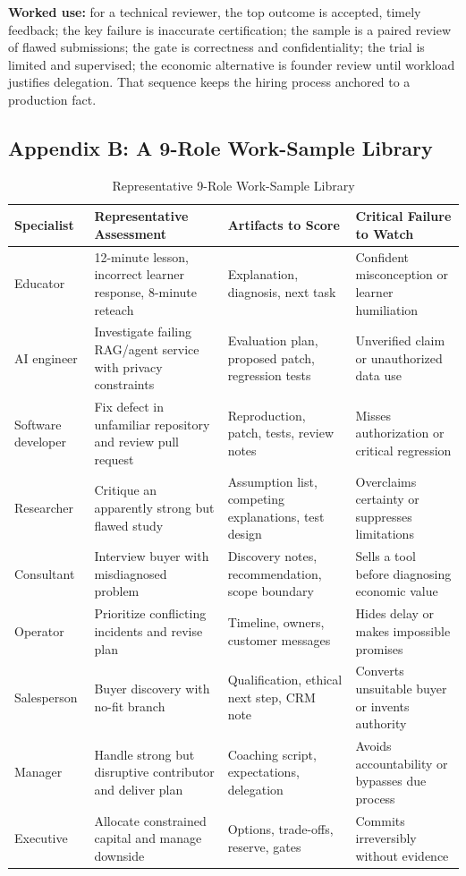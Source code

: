 \noindent\textbf{Worked use:} for a technical reviewer, the top outcome is accepted, timely feedback; the key failure is inaccurate certification; the sample is a paired review of flawed submissions; the gate is correctness and confidentiality; the trial is limited and supervised; the economic alternative is founder review until workload justifies delegation. That sequence keeps the hiring process anchored to a production fact.

\subsection*{Appendix B: A 9-Role Work-Sample Library}

\begin{table}[t]
\centering
\small
\caption{Representative 9-Role Work-Sample Library}
\label{tab:nine_role_work_samples}
\begin{tabularx}{\textwidth}{p{2.6cm} p{4.6cm} p{4.0cm} p{4.2cm}}
\toprule
\textbf{Specialist} & \textbf{Representative Assessment} & \textbf{Artifacts to Score} & \textbf{Critical Failure to Watch} \\
\midrule
Educator & 12-minute lesson, incorrect learner response, 8-minute reteach & Explanation, diagnosis, next task & Confident misconception or learner humiliation \\
AI engineer & Investigate failing RAG/agent service with privacy constraints & Evaluation plan, proposed patch, regression tests & Unverified claim or unauthorized data use \\
Software developer & Fix defect in unfamiliar repository and review pull request & Reproduction, patch, tests, review notes & Misses authorization or critical regression \\
Researcher & Critique an apparently strong but flawed study & Assumption list, competing explanations, test design & Overclaims certainty or suppresses limitations \\
Consultant & Interview buyer with misdiagnosed problem & Discovery notes, recommendation, scope boundary & Sells a tool before diagnosing economic value \\
Operator & Prioritize conflicting incidents and revise plan & Timeline, owners, customer messages & Hides delay or makes impossible promises \\
Salesperson & Buyer discovery with no-fit branch & Qualification, ethical next step, CRM note & Converts unsuitable buyer or invents authority \\
Manager & Handle strong but disruptive contributor and deliver plan & Coaching script, expectations, delegation & Avoids accountability or bypasses due process \\
Executive & Allocate constrained capital and manage downside & Options, trade-offs, reserve, gates & Commits irreversibly without evidence \\
\bottomrule
\end{tabularx}
\end{table}

